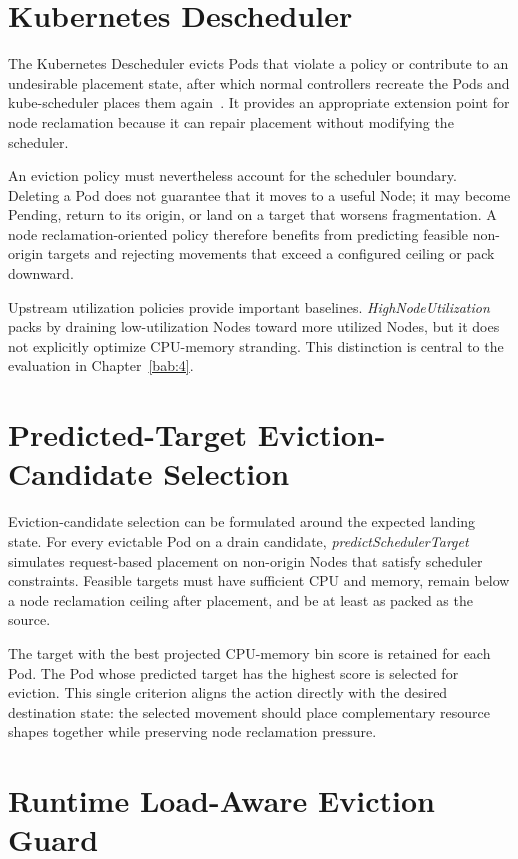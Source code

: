 \section{Kubernetes Descheduler}
\label{sec:deschedulerLimitations}

The Kubernetes Descheduler evicts Pods that violate a policy or contribute to an undesirable placement state, after which normal controllers recreate the Pods and kube-scheduler places them again~\citep{k8s_descheduler_docs}. It provides an appropriate extension point for node reclamation because it can repair placement without modifying the scheduler.

An eviction policy must nevertheless account for the scheduler boundary. Deleting a Pod does not guarantee that it moves to a useful Node; it may become Pending, return to its origin, or land on a target that worsens fragmentation. A node reclamation-oriented policy therefore benefits from predicting feasible non-origin targets and rejecting movements that exceed a configured ceiling or pack downward.

Upstream utilization policies provide important baselines. \textit{HighNodeUtilization} packs by draining low-utilization Nodes toward more utilized Nodes, but it does not explicitly optimize CPU-memory stranding. This distinction is central to the evaluation in Chapter~\ref{bab:4}.

\section{Predicted-Target Eviction-Candidate Selection}
\label{sec:predictedTargetSelection}

Eviction-candidate selection can be formulated around the expected landing state. For every evictable Pod on a drain candidate, \textit{predictSchedulerTarget} simulates request-based placement on non-origin Nodes that satisfy scheduler constraints. Feasible targets must have sufficient CPU and memory, remain below a node reclamation ceiling after placement, and be at least as packed as the source.

The target with the best projected CPU-memory bin score is retained for each Pod. The Pod whose predicted target has the highest score is selected for eviction. This single criterion aligns the action directly with the desired destination state: the selected movement should place complementary resource shapes together while preserving node reclamation pressure.

\section{Runtime Load-Aware Eviction Guard}
\label{sec:runtimeLoadAwareEviction}


